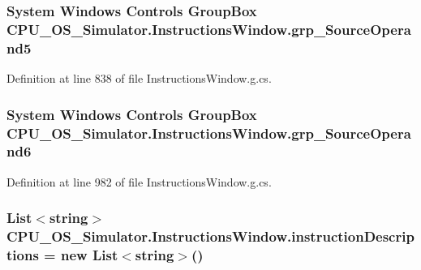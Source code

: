 \subsubsection[{grp\+\_\+\+Source\+Operand5}]{\setlength{\rightskip}{0pt plus 5cm}System Windows Controls Group\+Box C\+P\+U\+\_\+\+O\+S\+\_\+\+Simulator.\+Instructions\+Window.\+grp\+\_\+\+Source\+Operand5\hspace{0.3cm}{\ttfamily [package]}}\label{class_c_p_u___o_s___simulator_1_1_instructions_window_ab16ea5f8e2e761d0a7a0fe7054dfa3b5}


Definition at line 838 of file Instructions\+Window.\+g.\+cs.

\hypertarget{class_c_p_u___o_s___simulator_1_1_instructions_window_a46c1f50385d01108637e574343a99bfd}{}
\subsubsection[{grp\+\_\+\+Source\+Operand6}]{\setlength{\rightskip}{0pt plus 5cm}System Windows Controls Group\+Box C\+P\+U\+\_\+\+O\+S\+\_\+\+Simulator.\+Instructions\+Window.\+grp\+\_\+\+Source\+Operand6\hspace{0.3cm}{\ttfamily [package]}}\label{class_c_p_u___o_s___simulator_1_1_instructions_window_a46c1f50385d01108637e574343a99bfd}


Definition at line 982 of file Instructions\+Window.\+g.\+cs.

\hypertarget{class_c_p_u___o_s___simulator_1_1_instructions_window_a678ab4df2b78758142472eeed8c5d7ba}{}
\subsubsection[{instruction\+Descriptions}]{\setlength{\rightskip}{0pt plus 5cm}List$<$string$>$ C\+P\+U\+\_\+\+O\+S\+\_\+\+Simulator.\+Instructions\+Window.\+instruction\+Descriptions = new List$<$string$>$()\hspace{0.3cm}{\ttfamily [private]}}\label{class_c_p_u___o_s___simulator_1_1_instructions_window_a678ab4df2b78758142472eeed8c5d7ba}


